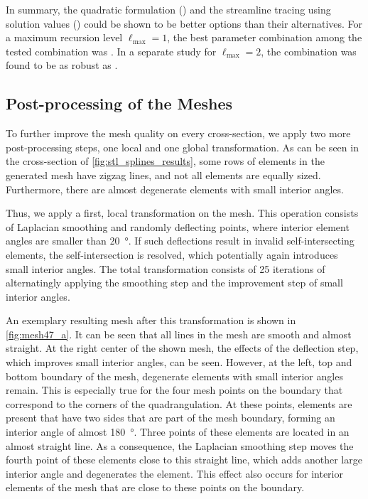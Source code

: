 In summary, the quadratic formulation () and the streamline tracing using solution values () could be shown to be better options than their alternatives. For a maximum recursion level $\ell_\text{max}=1$, the best parameter combination among the tested combination was . In a separate study for $\ell_\text{max}=2$, the combination  was found to be as robust as .
%

\subsection{Post-processing of the Meshes}

To further improve the mesh quality on every cross-section, we apply two more post-processing steps, one local and one global transformation.
As can be seen in the cross-section of \cref{fig:stl_splines_results}, some rows of elements in the generated mesh have zigzag lines, and not all elements are equally sized. Furthermore, there are almost degenerate elements with small interior angles. 

Thus, we apply a first, local transformation on the mesh. This operation consists of Laplacian smoothing and randomly deflecting points, where interior element angles are smaller than \SI{20}{\degree}. If such deflections result in invalid self-intersecting elements, the self-intersection is resolved, which potentially again introduces small interior angles. The total transformation consists of 25 iterations of alternatingly applying the smoothing step and the improvement step of small interior angles.

An exemplary resulting mesh after this transformation is shown in \cref{fig:mesh47_a}. It can be seen that all lines in the mesh are smooth and almost straight. At the right center of the shown mesh, the effects of the deflection step, which improves small interior angles, can be seen. However, at the left, top and bottom boundary of the mesh, degenerate elements with small interior angles remain. This is especially true for the four mesh points on the boundary that correspond to the corners of the quadrangulation. At these points, elements are present that have two sides that are part of the mesh boundary, forming an interior angle of almost \SI{180}{\degree}. Three points of these elements are located in an almost straight line. As a consequence, the Laplacian smoothing step moves the fourth point of these elements close to this straight line, which adds another large interior angle and degenerates the element. This effect also occurs for interior elements of the mesh that are close to these points on the boundary.

